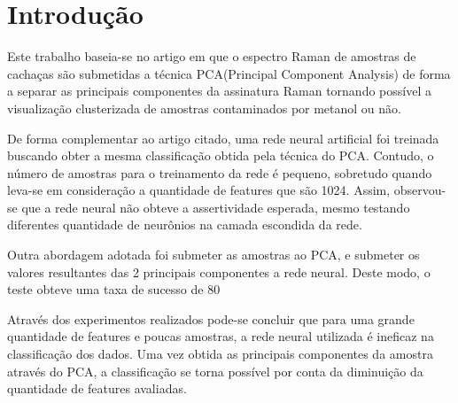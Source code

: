 \documentclass[english]{article}
\begin{document}
\pagestyle{empty} 
\sloppy
{}

\begin{abstract}
O presente trabalho valida a utilização de redes neurais artificiais na interpretação de dados do espectro Raman de amostras de cachaça. Combinando a modelagem a técnica PCA(Principal Component Analysis) de forma a maximizar a taxa de sucesso obtida. \vspace{2cm}
\end{abstract}

\section{Introdução}
\vspace{1cm} 
Este trabalho baseia-se no artigo \cite{DeGoes2016} em que o espectro Raman de amostras de cachaças são submetidas a técnica PCA(Principal Component Analysis) de forma a separar as principais componentes da assinatura Raman tornando possível a visualização clusterizada de amostras contaminados por metanol ou não.

De forma complementar ao artigo citado, uma rede neural artificial foi treinada buscando obter a mesma classificação obtida pela técnica do PCA. Contudo, o número de amostras para o treinamento da rede é pequeno, sobretudo quando leva-se em consideração a quantidade de features que são 1024. Assim, observou-se que a rede neural não obteve a assertividade esperada, mesmo testando diferentes quantidade de neurônios na camada escondida da rede.

Outra abordagem adotada foi submeter as amostras ao PCA, e submeter os valores resultantes das 2 principais componentes a rede neural. Deste modo, o teste obteve uma taxa de sucesso de 80%

Através dos experimentos realizados pode-se concluir que para uma grande quantidade de features e poucas amostras, a rede neural utilizada é ineficaz na classificação dos dados. Uma vez obtida as principais componentes da amostra através do PCA, a classificação se torna possível por conta da diminuição da quantidade de features avaliadas.
\end{document}
